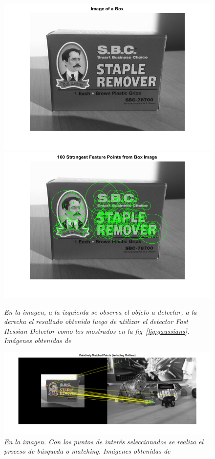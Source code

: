 \begin{figure}[hp]
  \centering
  \includegraphics[scale=.4]{images/surfbox}
  \includegraphics[scale=.4]{images/surfedbox}
  \caption{\em En la imagen, a la izquierda se observa el objeto a detectar, a la derecha el resultado obtenido luego de utilizar el detector \textit{Fast Hessian Detector} como los mostrados en la fig~\ref{fig:gaussians}. Imágenes obtenidas de \cite{matlab2014} }   \label{fig:surfbox}
\end{figure}

\begin{figure}
  \centering
  \includegraphics[scale=.4]{images/surfmatching}
  \caption{\em En la imagen. Con los puntos de interés seleccionados se realiza el proceso de búsqueda o \textit{matching}. Imágenes obtenidas de \cite{matlab2014} }   \label{fig:surfmatching}
\end{figure}

